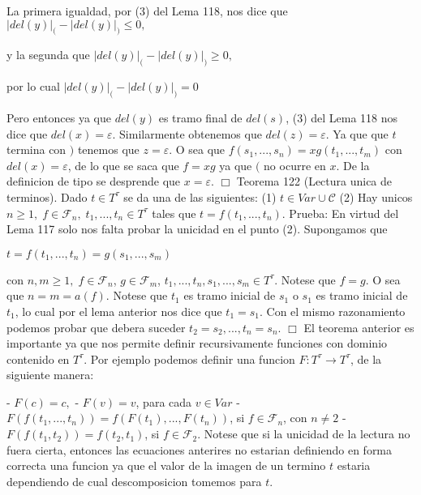 La primera igualdad, por (3) del Lema 118, nos dice que
\(\displaystyle \left\vert del(y)\right\vert _{(}-\left\vert del(y)\right\vert _{)}\leq 0, \)

y la segunda que
\(\displaystyle \left\vert del(y)\right\vert _{(}-\left\vert del(y)\right\vert _{)}\geq 0, \)

por lo cual
\(\displaystyle \left\vert del(y)\right\vert _{(}-\left\vert del(y)\right\vert _{)}=0 \)

Pero entonces ya que \(del(y)\) es tramo final de \(del(s)\), (3) del Lema 118 nos dice que \(del(x)=\varepsilon \). Similarmente obtenemos que \(del(z)=\varepsilon \). Ya que que \(t\) termina con \()\) tenemos que \(z=\varepsilon \). O sea que \(f(s_{1},...,s_{n})=xg(t_{1},...,t_{m})\) con \(del(x)=\varepsilon \), de lo que se saca que \(f=xg\) ya que \((\) no ocurre en \( x\). De la definicion de tipo se desprende que \(x=\varepsilon \). \(\Box\)
Teorema 122 (Lectura unica de terminos). Dado \(t\in T^{\tau } \) se da una de las siguientes:
(1) \(t\in Var\cup \mathcal{C}\)
(2) Hay unicos \(n\geq 1,\;f\in \mathcal{F} _{n},\;t_{1},...,t_{n}\in T^{\tau }\) tales que \( t=f(t_{1},...,t_{n})\).
Prueba: En virtud del Lema 117 solo nos falta probar la unicidad en el punto (2). Supongamos que

\(\displaystyle t=f(t_{1},...,t_{n})=g(s_{1},...,s_{m}) \)

con \(n,m\geq 1,\;f\in \mathcal{F}_{n}\), \(g\in \mathcal{F}_{m}\), \( t_{1},...,t_{n},s_{1},...,s_{m}\in T^{\tau }\). Notese que \(f=g\). O sea que \( n=m=a(f)\). Notese que \(t_{1}\) es tramo inicial de \(s_{1}\) o \(s_{1}\) es tramo inicial de \(t_{1}\), lo cual por el lema anterior nos dice que \(t_{1}=s_{1}\). Con el mismo razonamiento podemos probar que debera suceder \( t_{2}=s_{2},...,t_{n}=s_{n}\). \(\Box\)
El teorema anterior es importante ya que nos permite definir recursivamente funciones con dominio contenido en \(T^{\tau }\). Por ejemplo podemos definir una funcion \(F:T^{\tau }\rightarrow T^{\tau }\), de la siguiente manera:

- \(F(c)=c,\)
- \(F(v)=v\), para cada \(v\in Var\)
- \(F(f(t_{1},...,t_{n}))=f(F(t_{1}),...,F(t_{n}))\), si \(f\in \mathcal{ F}_{n}\), con \(n\neq 2\)
- \(F(f(t_{1},t_{2}))=f(t_{2},t_{1})\), si \(f\in \mathcal{F}_{2}.\)
Notese que si la unicidad de la lectura no fuera cierta, entonces las ecuaciones anterires no estarian definiendo en forma correcta una funcion ya que el valor de la imagen de un termino \(t\) estaria dependiendo de cual descomposicion tomemos para \(t\).

